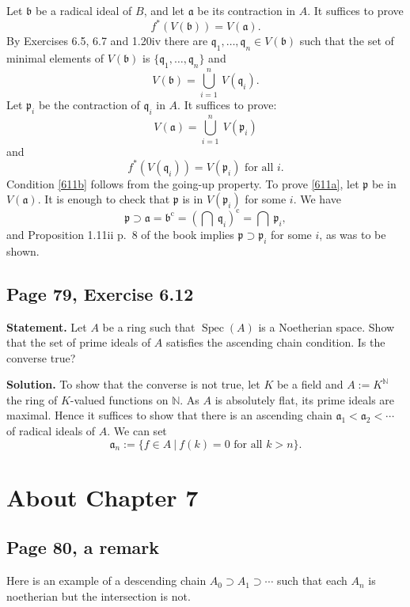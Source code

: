 \documentclass[parskip=half,fontsize=12pt]{scrartcl}%
\newcommand{\oo}{\operatorname}\newcommand{\ooo}{\operatorname*}
\newcommand{\mf}{\mathfrak}
\newcommand{\aaa}{\mf a}
\newcommand{\bbb}{\mf b}
\newcommand{\ppp}{\mf p}
\newcommand{\qqq}{\mf q}
\newcommand{\Spec}{\operatorname{Spec}}\newcommand{\Sp}{\operatorname{Spec}}
\begin{document}
Let $\bbb$ be a radical ideal of $B$, and let $\aaa$ be its contraction in $A$. It suffices to prove 
$$
f^*(V(\bbb))=V(\aaa).
$$ 
By Exercises 6.5, 6.7 and 1.20iv there are $\qqq_1,\dots,\qqq_n\in V(\bbb)$ such that the set of minimal elements of $V(\bbb)$ is $\{\qqq_1,\dots,\qqq_n\}$ and 
$$
V(\bbb)=\bigcup_{i=1}^n\ V(\qqq_i).
$$ 
Let $\ppp_i$ be the contraction of $\qqq_i$ in $A$. It suffices to prove: 
\begin{equation}\label{611a}
V(\aaa)=\bigcup_{i=1}^n\ V(\ppp_i)
\end{equation} 
and 
\begin{equation}\label{611b}
f^*(V(\qqq_i))=V(\ppp_i)\text{ for all }i.
\end{equation} 
Condition \eqref{611b} follows from the going-up property. To prove \eqref{611a}, let $\ppp$ be in $V(\aaa)$. It is enough to check that $\ppp$ is in $V(\ppp_i)$ for some $i$. We have 
$$
\ppp\supset\aaa=\bbb^{\oo c}=\left(\bigcap\ \qqq_i\right)^{\oo c}=\bigcap\ \ppp_i,
$$ 
and Proposition 1.11ii p.~8 of the book implies $\ppp\supset\ppp_i$ for some $i$, as was to be shown. 

\subsection{Page 79, Exercise 6.12}%

\textbf{Statement.} Let $A$ be a ring such that $\Spec(A)$ is a Noetherian space. Show that the set of prime ideals of $A$ satisfies the ascending chain condition. Is the converse true?

\textbf{Solution.} To show that the converse is not true, let $K$ be a field and $A:=K^{\mathbb N}$ the ring of $K$-valued functions on $\mathbb N$. As $A$ is absolutely flat, its prime ideals are maximal. Hence it suffices to show that there is an ascending chain $\aaa_1<\aaa_2<\cdots$ of radical ideals of $A$. We can set 
$$
\aaa_n:=\{f\in A\ |\ f(k)=0\text{ for all }k>n\}.
$$

\section{About Chapter 7}%

\subsection{Page 80, a remark}%

Here is an example of a descending chain $A_0\supset A_1\supset\cdots$ such that each $A_n$ is noetherian but the intersection is not.
\end{document}
